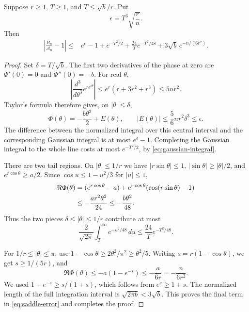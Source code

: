 \begin{theorem}
\label{thm:quantitative-saddle}
Suppose $r\geq1$, $T\geq1$, and $T\leq\sqrt b/r$.  Put
\[
 \epsilon=T^3\sqrt{\frac rn}.
\]
Then
\begin{align}\label{eq:saddle-error}
 \left|\frac{B_n}{\mathcal A_n}-1\right|
 \leq{}&e^\epsilon-1+e^{-T^2/2}
       +\frac{24}{T}e^{-T^2/48}
       +3\sqrt b\,e^{-n/(6r^2)}.
\end{align}
\end{theorem}

\begin{proof}
Set $\delta=T/\sqrt b$.  The first two derivatives of the phase at
zero are $\Phi'(0)=0$ and $\Phi''(0)=-b$.  For real $\theta$,
\[
 \left|\frac{d^3}{d\theta^3}e^{r e^{i\theta}}\right|
 \leq e^r(r+3r^2+r^3)\leq5nr^2.
\]
Taylor's formula therefore gives, on $|\theta|\leq\delta$,
\[
 \Phi(\theta)=-\frac{b\theta^2}{2}+E(\theta),
 \qquad |E(\theta)|\leq\frac56nr^2\delta^3\leq\epsilon.
\]
The difference between the normalized integral over this central
interval and the corresponding Gaussian integral is at most
$e^\epsilon-1$.  Completing the Gaussian integral to the whole line
costs at most $e^{-T^2/2}$, by
\eqref{eq:gaussian-integral}.

There are two tail regions.  On $|\theta|\leq1/r$ we have
$|r\sin\theta|\leq1$, $|\sin\theta|\geq|\theta|/2$, and
$e^{r\cos\theta}\geq a/2$.  Since $\cos u\leq1-u^2/3$ for
$|u|\leq1$,
\begin{align}
 \Re\Phi(\theta)
 &=(e^{r\cos\theta}-a)
   +e^{r\cos\theta}(\cos(r\sin\theta)-1)\notag\\
 &\leq-\frac{ar^2\theta^2}{24}
 \leq-\frac{b\theta^2}{48}.
 \label{eq:growth-middle-tail}
\end{align}
Thus the two pieces $\delta\leq|\theta|\leq1/r$ contribute at most
\[
 \frac2{\sqrt{2\pi}}\int_T^\infty e^{-u^2/48}\,du
 \leq\frac{24}{T}e^{-T^2/48}.
\]

For $1/r\leq|\theta|\leq\pi$, use
$1-\cos\theta\geq2\theta^2/\pi^2\geq\theta^2/5$.
Writing $s=r(1-\cos\theta)$, we get $s\geq1/(5r)$, and
\begin{equation}\label{eq:growth-far-tail}
 \Re\Phi(\theta)
 \leq-a(1-e^{-s})
 \leq-\frac a{6r}=-\frac n{6r^2}.
\end{equation}
We used $1-e^{-s}\geq s/(1+s)$, which follows from $e^s\geq1+s$.
The normalized length of the full integration interval is
$\sqrt{2\pi b}<3\sqrt b$.  This proves the final term in
\eqref{eq:saddle-error} and completes the proof.
\end{proof}

